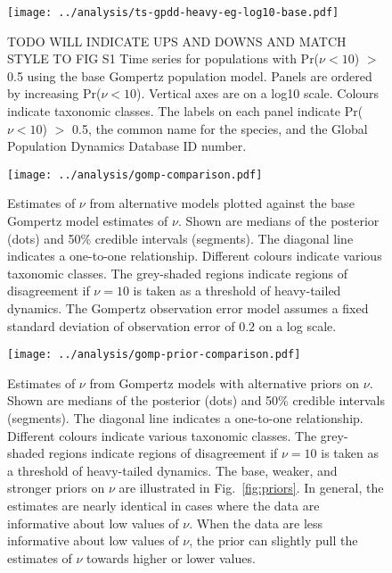 \clearpage

\begin{figure}[htbp]
\begin{center}
\texttt{[image: ../analysis/ts-gpdd-heavy-eg-log10-base.pdf]}
\caption{
TODO WILL INDICATE UPS AND DOWNS AND MATCH STYLE TO FIG S1
  Time series for populations with Pr($\nu < 10$) $>$ 0.5 using the base
  Gompertz population model. Panels are ordered by increasing Pr($\nu < 10$).
  Vertical axes are on a log10 scale. Colours indicate taxonomic classes. The
  labels on each panel indicate Pr($\nu < 10$) $>$ 0.5, the common name for the
  species, and the Global Population Dynamics Database ID number.
}
\label{fig:heavy-ts}
\end{center}
\end{figure}

\clearpage

\begin{figure}[htbp]
\begin{center}
\texttt{[image: ../analysis/gomp-comparison.pdf]}
\caption{
  Estimates of $\nu$ from alternative models plotted against the base Gompertz
  model estimates of $\nu$. Shown are medians of the posterior (dots) and 50\%
  credible intervals (segments). The diagonal line indicates a one-to-one
  relationship. Different colours indicate various taxonomic classes. The
  grey-shaded regions indicate regions of disagreement if $\nu = 10$ is taken
  as a threshold of heavy-tailed dynamics. The Gompertz observation error model
  assumes a fixed standard deviation of observation error of $0.2$ on a log
  scale.
}
\label{fig:alt}
\end{center}
\end{figure}

\clearpage

\begin{figure}[htbp]
\begin{center}
\texttt{[image: ../analysis/gomp-prior-comparison.pdf]}
\caption{
Estimates of $\nu$ from Gompertz models with alternative priors on $\nu$. Shown are medians of the posterior (dots) and 50\% credible intervals (segments). The diagonal line indicates a one-to-one relationship. Different colours indicate various taxonomic classes. The grey-shaded regions indicate regions of disagreement if $\nu = 10$ is taken as a threshold of heavy-tailed dynamics. The base, weaker, and stronger priors on $\nu$ are illustrated in Fig.~\ref{fig:priors}. In general, the estimates are nearly identical in cases where the data are informative about low values of $\nu$. When the data are less informative about low values of $\nu$, the prior can slightly pull the estimates of $\nu$ towards higher or lower values.
}
\label{fig:alt}
\end{center}
\end{figure}


